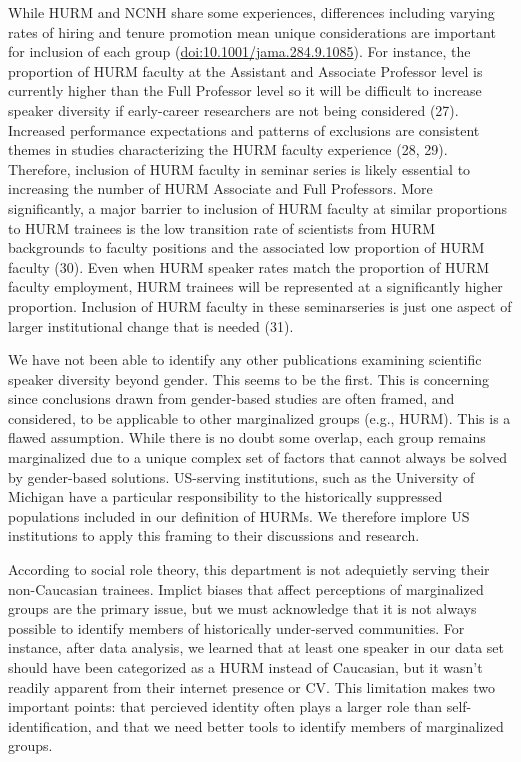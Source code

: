 \documentclass[10pt,]{article}
\begin{document}
While HURM and NCNH share some experiences, differences including
varying rates of hiring and tenure promotion mean unique considerations
are important for inclusion of each group
(\url{doi:10.1001/jama.284.9.1085}). For instance, the proportion of
HURM faculty at the Assistant and Associate Professor level is currently
higher than the Full Professor level so it will be difficult to increase
speaker diversity if early-career researchers are not being considered
(27). Increased performance expectations and patterns of exclusions are
consistent themes in studies characterizing the HURM faculty experience
(28, 29). Therefore, inclusion of HURM faculty in seminar series is
likely essential to increasing the number of HURM Associate and Full
Professors. More significantly, a major barrier to inclusion of HURM
faculty at similar proportions to HURM trainees is the low transition
rate of scientists from HURM backgrounds to faculty positions and the
associated low proportion of HURM faculty (30). Even when HURM speaker
rates match the proportion of HURM faculty employment, HURM trainees
will be represented at a significantly higher proportion. Inclusion of
HURM faculty in these seminarseries is just one aspect of larger
institutional change that is needed (31).

We have not been able to identify any other publications examining
scientific speaker diversity beyond gender. This seems to be the first.
This is concerning since conclusions drawn from gender-based studies are
often framed, and considered, to be applicable to other marginalized
groups (e.g., HURM). This is a flawed assumption. While there is no
doubt some overlap, each group remains marginalized due to a unique
complex set of factors that cannot always be solved by gender-based
solutions. US-serving institutions, such as the University of Michigan
have a particular responsibility to the historically suppressed
populations included in our definition of HURMs. We therefore implore US
institutions to apply this framing to their discussions and research.

According to social role theory, this department is not adequietly
serving their non-Caucasian trainees. Implict biases that affect
perceptions of marginalized groups are the primary issue, but we must
acknowledge that it is not always possible to identify members of
historically under-served communities. For instance, after data
analysis, we learned that at least one speaker in our data set should
have been categorized as a HURM instead of Caucasian, but it wasn't
readily apparent from their internet presence or CV. This limitation
makes two important points: that percieved identity often plays a larger
role than self-identification, and that we need better tools to identify
members of marginalized groups.
\end{document}
